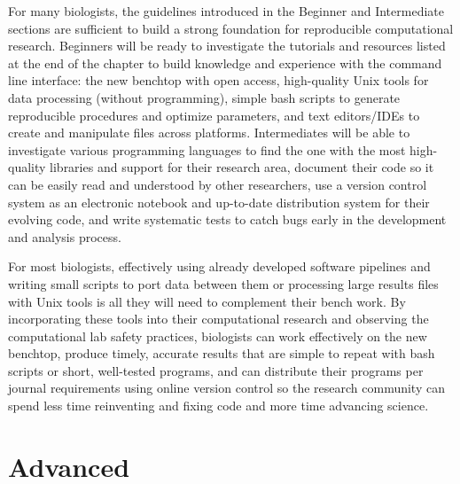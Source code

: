 \documentclass[ChapterTOCs,krantz2]{krantz} %
\begin{document}
For many biologists, the guidelines introduced in the Beginner and Intermediate
sections are sufficient to build a strong foundation for reproducible
computational research.  Beginners will be ready to investigate the tutorials
and resources listed at the end of the chapter to build knowledge and
experience with the command line interface: the new benchtop with open access,
high-quality Unix tools for data processing (without programming), simple bash
scripts to generate reproducible procedures and optimize parameters, and text
editors/IDEs to create and manipulate files across platforms.  Intermediates
will be able to investigate various programming languages to find the one with
the most high-quality libraries and support for their research area, document
their code so it can be easily read and understood by other researchers, use a
version control system as an electronic notebook and up-to-date distribution
system for their evolving code, and write systematic tests to catch bugs early
in the development and analysis process. 

For most biologists, effectively using already developed software pipelines and writing
small scripts to port data between them or processing large results files with
Unix tools is all they will need to complement their bench work.  By
incorporating these tools into their computational research and observing the
computational lab safety practices, biologists can work
effectively on the new benchtop, produce timely, accurate results that are
simple to repeat with bash scripts or short, well-tested programs, and can
distribute their programs per journal requirements using online version control
so the research community can spend less time reinventing and fixing code and
more time advancing science. 

\section{Advanced}
\end{document}
